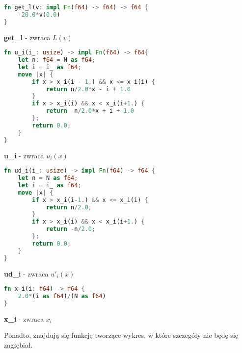 \documentclass[12pt]{article}
\begin{document}
\begin{lstlisting}[language=Rust, style=boxed]
fn get_l(v: impl Fn(f64) -> f64) -> f64 {
	-20.0*v(0.0)
}
\end{lstlisting}
\centerline{\textbf{get\_l} - zwraca $L(v)$}
\vskip 1cm

\newpage

\begin{lstlisting}[language=Rust, style=boxed]
fn u_i(i_: usize) -> impl Fn(f64) -> f64{
	let n: f64 = N as f64;
	let i = i_ as f64;
	move |x| {
		if x > x_i(i - 1.) && x <= x_i(i) { 
			return n/2.0*x - i + 1.0
		}
		if x > x_i(i) && x < x_i(i+1.) { 
			return -n/2.0*x + i + 1.0
		};
		return 0.0;
	}
}
\end{lstlisting}
\centerline{\textbf{u\_i} - zwraca $u_i(x)$}
\vskip 1cm

\begin{lstlisting}[language=Rust, style=boxed]
fn ud_i(i_: usize) -> impl Fn(f64) -> f64 {
	let n = N as f64;
	let i = i_ as f64;
	move |x| {
		if x > x_i(i-1.) && x <= x_i(i) { 
			return n/2.0;
		}
		if x > x_i(i) && x < x_i(i+1.) { 
			return -n/2.0;
		};
		return 0.0;
	}
}
\end{lstlisting}
\centerline{\textbf{ud\_i} - zwraca $u'_i(x)$}
\vskip 1cm

\newpage

\begin{lstlisting}[language=Rust, style=boxed]
fn x_i(i: f64) -> f64 {
	2.0*(i as f64)/(N as f64)
}
\end{lstlisting}
\centerline{\textbf{x\_i} - zwraca $x_i$}
\vskip 1cm

\noindent Ponadto, znajdują się funkcję tworzące wykres, w które szczegóły nie
 będę się zagłębiał.

\newpage
\end{document}

